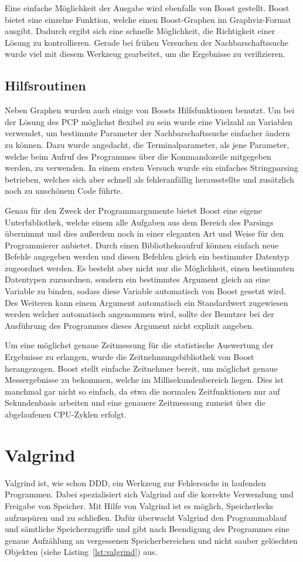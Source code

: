 Eine einfache Möglichkeit der Ausgabe wird ebenfalls von Boost gestellt. Boost bietet eine einzelne Funktion, welche einen Boost-Graphen im Graphviz-Format ausgibt. Dadurch ergibt sich eine schnelle 
Möglichkeit, die Richtigkeit einer Lösung zu kontrollieren. Gerade bei frühen Versuchen der Nachbarschaftssuche wurde viel mit diesem Werkzeug gearbeitet, um die Ergebnisse zu verifizieren. 

\subsection{Hilfsroutinen}
Neben Graphen wurden auch einige von Boosts Hilfsfunktionen benutzt. Um bei der Lösung des PCP möglichst flexibel zu sein wurde eine Vielzahl an Variablen verwendet, um bestimmte Parameter der 
Nachbarschaftssuche einfacher ändern zu können. Dazu wurde angedacht, die Terminalparameter, als jene Parameter, welche beim Aufruf des Programmes über die Kommandozeile mitgegeben werden, zu verwenden. 
In einem ersten Versuch wurde ein einfaches Stringparsing betrieben, welches sich aber schnell als fehleranfällig herausstellte und zusätzlich noch zu unschönem Code führte. 

Genau für den Zweck der Programmargumente bietet Boost eine eigene Unterbibliothek, welche einem alle Aufgaben aus dem Bereich des Parsings übernimmt und dies außerdem noch in ei\-ner eleganten Art und Weise für
den Programmierer anbietet. Durch einen Bibliotheksaufruf können einfach neue Befehle angegeben werden und diesen Befehlen gleich ein bestimmter Datentyp zugeordnet werden. Es besteht aber nicht nur die 
Möglichkeit, einen bestimmten Datentypen zuzuordnen, sondern ein bestimmtes Argument gleich an eine Variable zu binden, sodass diese Variable automatisch von Boost gesetzt wird. Des Weiteren kann einem
Argument automatisch ein Standardwert zugewiesen werden welcher automatisch angenommen wird, sollte der Benutzer bei der Ausführung des Programmes dieses Argument nicht explizit angeben. 

Um eine möglichst genaue Zeitmessung für die statistische Auswertung der Ergebnisse zu erlangen, wurde die Zeitnehmungsbibliothek von Boost herangezogen. Boost stellt einfache Zeitnehmer bereit, um 
möglichst genaue Messergebnisse zu bekommen, welche im Millisekundenbereich liegen. Dies ist manchmal gar nicht so einfach, da etwa die normalen Zeitfunktionen nur auf Sekundenbasis arbeiten und eine 
genauere Zeitmessung zumeist über die abgelaufenen CPU-Zyklen erfolgt.

\section{Valgrind}
Valgrind ist, wie schon DDD, ein Werkzeug zur Fehlersuche in laufenden Programmen. Dabei spezialisiert sich Valgrind auf die korrekte Verwendung und Freigabe von Speicher. Mit Hilfe von Valgrind ist es
möglich, Speicherlecks aufzuspüren und zu schließen. Dafür überwacht Valgrind den Programmablauf und sämtliche Speicherzugriffe und gibt nach Beendigung des Programmes eine genaue Aufzählung an vergessenen Speicherbereichen und 
nicht sauber gelöschten Objekten (siehe Listing~\ref{lst:valgrind}) aus. 

